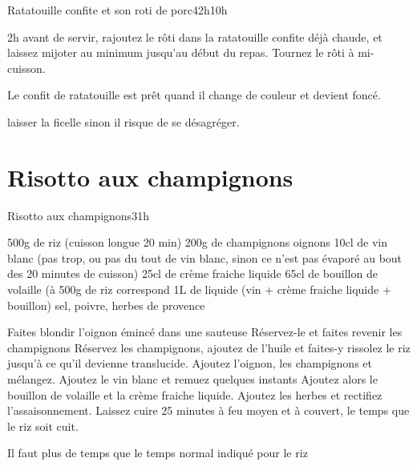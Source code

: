 {\begin{recette}{Ratatouille confite et son roti de porc}{4}{2h}{10h}
\begin{cuisson}
2h avant de servir, rajoutez le rôti dans la ratatouille confite déjà chaude, et laissez mijoter au minimum jusqu'au début du 
repas. Tournez le rôti à mi-cuisson.

Le confit de ratatouille est prêt quand il change de couleur et devient foncé. 

laisser la ficelle sinon il risque de se désagréger.
\end{cuisson}
\end{recette}

\section{Risotto aux champignons}
\begin{recette}{Risotto aux champignons}{3}{1h}{}
\begin{ingredients}
\ingredient 500g de riz (cuisson longue 20 min)
\ingredient 200g de champignons
 oignons
\ingredient 10cl de vin blanc (pas trop, ou pas du tout de vin blanc, sinon ce n'est pas évaporé au bout des 20 minutes de 
cuisson)
\ingredient 25cl de crème fraiche liquide
\ingredient 65cl de bouillon de volaille (à 500g de riz correspond 1L de liquide (vin + crème fraiche liquide + bouillon)
\ingredient sel, poivre, herbes de provence
\end{ingredients}

\begin{preparation}
\etape Faites blondir l'oignon émincé dans une sauteuse
\etape Réservez-le et faites revenir les champignons
\etape Réservez les champignons, ajoutez de l'huile et faites-y rissolez le riz jusqu'à ce qu'il devienne translucide.
\etape Ajoutez l'oignon, les champignons et mélangez.
\etape Ajoutez le vin blanc et remuez quelques instants 
\etape Ajoutez alors le bouillon de volaille et la crème fraiche liquide. 
\etape Ajoutez les herbes et rectifiez l'assaisonnement.
\etape Laissez cuire 25 minutes à feu moyen et à couvert, le temps que le riz soit cuit. 
\begin{remarque}
Il faut plus de temps que le temps normal indiqué pour le riz
\end{remarque}
\end{preparation}
\end{recette}


}
